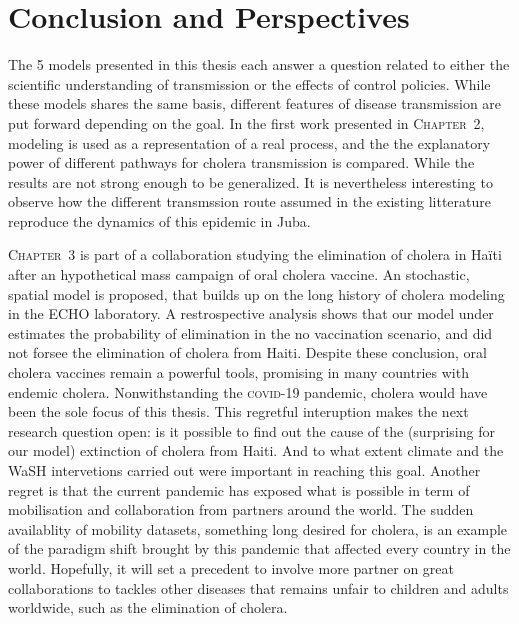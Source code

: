 \chapter*{Conclusion and Perspectives}
The 5 models presented in this thesis each answer a question related to either the scientific understanding of transmission or the effects of control policies. While these models shares the same basis, different features of disease transmission are put forward depending on the goal. 
In the first work presented in \textsc{Chapter~2}, modeling is used as a representation of a real process, and the the explanatory power of different pathways for cholera transmission is compared. While the results are not strong enough to be generalized. It is nevertheless interesting to observe how the different transmssion route assumed in the existing litterature reproduce the dynamics of this epidemic in Juba.

\textsc{Chapter~3} is part of a collaboration studying the elimination of cholera in Haïti after an hypothetical mass campaign of oral cholera vaccine. An stochastic, spatial model is proposed, that builds up on the long history of cholera modeling in the ECHO laboratory. A restrospective analysis shows that our model under estimates the probability of elimination in the no vaccination scenario, and did not forsee the elimination of cholera from Haiti. Despite these conclusion, oral cholera vaccines remain a powerful tools, promising in many countries with endemic cholera. 
Nonwithstanding the \textsc{covid}-19 pandemic, cholera would have been the sole focus of this thesis. This regretful interuption makes the next research question open: is it possible to find out the cause of the (surprising for our model) extinction of cholera from Haiti. And to what extent climate and the WaSH intervetions carried out were important in reaching this goal. Another regret is that the current pandemic has exposed what is possible in term of mobilisation and collaboration from partners around the world. The sudden availablity of mobility datasets, something long desired for cholera, is an example of the paradigm shift brought by this pandemic that affected every country in the world. Hopefully, it will set a precedent to involve more partner on great collaborations to tackles other diseases that remains unfair to children and adults worldwide, such as the elimination of cholera.

